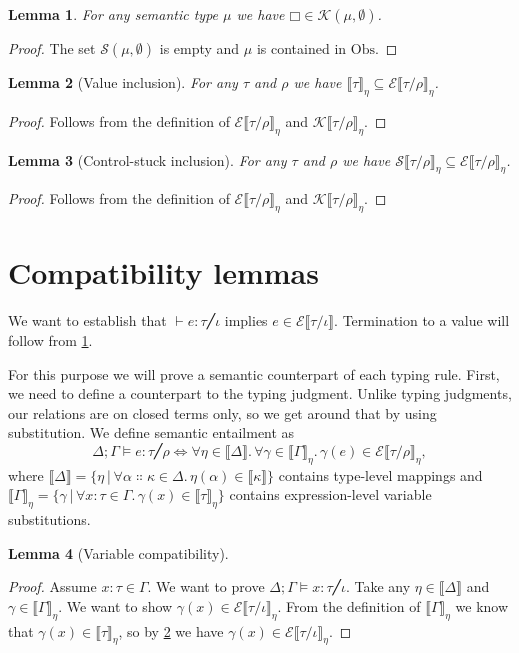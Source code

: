 \documentclass[a4paper, 12pt]{report}
\newcommand{\E}{\mathcal{E}}
\newcommand{\K}{\mathcal{K}}
\renewcommand{\S}{\mathcal{S}}
\newcommand{\Obs}{\mathrm{Obs}}
\newcommand{\+}{\enspace}
\newtheorem{lemma}{Lemma}
\begin{document}
\begin{lemma}\label{empty-context}
	For any semantic type $μ$ we have $□ ∈ \K(μ,∅)$.
\end{lemma}
\begin{proof}
	The set $\S(μ,∅)$ is empty and $μ$ is contained in $\Obs$.
\end{proof}

\begin{lemma}[Value inclusion]\label{value-inclusion}
	For any $τ$ and $ρ$ we have $⟦τ⟧_η ⊆ \E⟦τ/ρ⟧_η$.
\end{lemma}
\begin{proof}
	Follows from the definition of $\E⟦τ/ρ⟧_η$ and $\K⟦τ/ρ⟧_η$.
\end{proof}

\begin{lemma}[Control-stuck inclusion]\label{stuck-inclusion}
For any $τ$ and $ρ$ we have $\S⟦τ/ρ⟧_η ⊆ \E⟦τ/ρ⟧_η$.
\end{lemma}
\begin{proof}
	Follows from the definition of $\E⟦τ/ρ⟧_η$ and $\K⟦τ/ρ⟧_η$.
\end{proof}

\section{Compatibility lemmas}
We want to establish that $⊢ e : τ ╱ ι$ implies $e ∈ \E⟦τ/ι⟧$.
Termination to a value will follow from \cref{empty-context}.

For this purpose we will prove a semantic counterpart of each typing rule.
First, we need to define a counterpart to the typing judgment.
Unlike typing judgments, our relations are on closed terms only,
so we get around that by using substitution.
We define semantic entailment as
$$Δ;Γ ⊨ e : τ ╱ ρ ⇔ ∀η∈⟦Δ⟧.\, ∀γ∈⟦Γ⟧_η.\,γ(e) ∈ \E⟦τ/ρ⟧_η,$$
where $⟦Δ⟧ = \{ η │ ∀α∷κ∈Δ.\,η(α) ∈ ⟦κ⟧ \}$ contains type-level mappings
and $⟦Γ⟧_η = \{ γ │ ∀x:τ∈Γ.\,γ(x) ∈ ⟦τ⟧_η\}$ contains expression-level
variable substitutions.

\begin{lemma}[Variable compatibility]
\end{lemma}
\begin{proof}
Assume $x : τ ∈ Γ$.
We want to prove $Δ;Γ ⊨ x : τ ╱ ι$.
Take any $η∈⟦Δ⟧$ and $γ∈⟦Γ⟧_η$.
We want to show $γ(x) ∈ \E⟦τ/ι⟧_η$.
From the definition of $⟦Γ⟧_η$
we know that $γ(x) ∈ ⟦τ⟧_η$,
so by \cref{value-inclusion} we have $γ(x) ∈ \E⟦τ/ι⟧_η$.
\end{proof}
\end{document}
